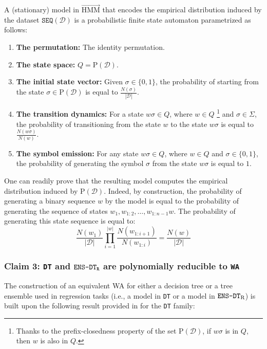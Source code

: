 A (stationary) model in $\overrightarrow{\text{HMM}}$ that encodes the empirical distribution induced by the dataset $\texttt{SEQ}(\mathcal{D})$ is a probabilistic finite state automaton parametrized as follows: 
\begin{enumerate}
    \item \textbf{The permutation:} The identity permutation.
    \item \textbf{The state space:} $Q = \text{P}(\mathcal{D})$.
    \item \textbf{The initial state vector:} Given $\sigma \in \{0,1\}$, the probability of starting from the state $\sigma \in \text{P}(\mathcal{D})$ is equal to $\frac{N(\sigma)}{|\mathcal{D}|}$.
    \item \textbf{The transition dynamics:} For a state $w \sigma \in Q$, where $w \in Q$ \footnote{Thanks to the prefix-closedness property of the set $\text{P}(\mathcal{D})$, if $w\sigma$ is in $Q$, then $w$ is also in $Q$.} and $\sigma \in \Sigma$,  the probability of transitioning from the state $w$ to the state $w\sigma$ is equal to $\frac{N(w \sigma)}{N(w)}$. 
    \item \textbf{The symbol emission:} For any state $w \sigma \in Q$, where $w \in Q$ and $\sigma \in \{0,1\}$, the probability of generating the symbol $\sigma$ from the state $w\sigma$ is equal to $1$.
 \end{enumerate}

One can readily prove that the resulting model computes the empirical distribution induced by $\text{P}(\mathcal{D})$. Indeed, by construction, the probability of generating a binary sequence $w$ by the model is equal to the probability of generating the sequence of states $w_{1}, w_{1:2}, \ldots, w_{1:n-1} w$. The probability of generating this state sequence is equal to:
$$\frac{N(w_{1})}{|\mathcal{D}|} \prod\limits_{i=1}^{|w|} \frac{N(w_{1:i+1})}{N(w_{1:i})} = \frac{N(w)}{|\mathcal{D}|}$$

\subsubsection{Claim 3: \texttt{DT} and $\texttt{\text{ENS-DT}}_{\texttt{\text{R}}}$ are polynomially reducible to \texttt{WA}}

The construction of an equivalent WA for either a decision tree or a tree ensemble used in regression tasks (i.e., a model in \texttt{DT} or a model in $\texttt{\text{ENS-DT}}_{\text{R}}$) is built upon the following result provided in \cite{marzouk24a} for the \texttt{DT} family:


